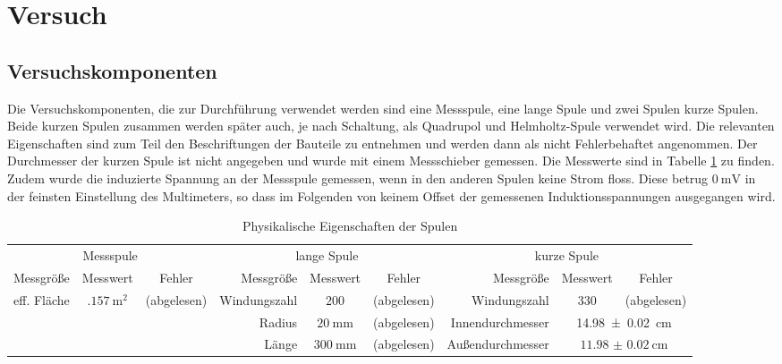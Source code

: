 \section{Versuch}
\subsection{Versuchskomponenten}
Die Versuchskomponenten, die zur Durchführung verwendet werden sind eine Messspule, eine lange Spule und zwei Spulen kurze Spulen. Beide kurzen Spulen zusammen werden später auch, je nach Schaltung, als Quadrupol und Helmholtz-Spule verwendet wird. Die relevanten Eigenschaften sind zum Teil den Beschriftungen der Bauteile zu entnehmen und werden dann als nicht Fehlerbehaftet angenommen. Der Durchmesser der kurzen Spule ist nicht angegeben und wurde mit einem Messschieber gemessen. Die Messwerte sind in Tabelle \ref{tab:eigenschaftenSpulen} zu finden. Zudem wurde die induzierte Spannung an der Messspule gemessen, wenn in den anderen Spulen keine Strom floss. Diese betrug $ \SI{0}{\milli\volt} $ in der feinsten Einstellung des Multimeters, so dass im Folgenden von keinem Offset der gemessenen Induktionsspannungen ausgegangen wird.
\begin{landscape}
\begin{table}
\thispagestyle{plain}
\begin{tabular}{r|cc||r|cc||r|cc}
	\multicolumn{3}{c}{Messspule} & \multicolumn{3}{c}{lange Spule} & \multicolumn{3}{c}{kurze Spule} \\
	Messgröße & Messwert & Fehler & Messgröße & Messwert & Fehler & Messgröße & Messwert & Fehler \\ \hline
	eff. Fläche & $ \SI{.157}{\square\meter} $ & (abgelesen) & Windungszahl & $ 200 $ & (abgelesen) & Windungszahl & 330 & (abgelesen) \\
	& & & Radius & $ \SI{20}{\milli\meter} $ & (abgelesen) & Innendurchmesser & \multicolumn{2}{c}{\SI{14.98(2)}{\centi\meter}} \\
	& & & Länge & $ \SI{300}{\milli\meter} $ & (abgelesen) & Außendurchmesser & \multicolumn{2}{c}{$ \SI{11.98(2)}{\centi\meter} $}	
\end{tabular}
\label{tab:eigenschaftenSpulen}
\caption{Physikalische Eigenschaften der Spulen}
\end{table}
\end{landscape}

